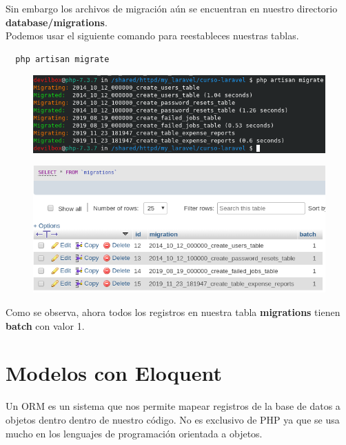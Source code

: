 \documentclass{article}
\begin{document}
Sin embargo los archivos de migración aún se encuentran en nuestro directorio
\textbf{database/migrations}.\\
Podemos usar el siguiente comando para reestableces nuestras tablas.\\

\begin{verbatim}
  php artisan migrate
\end{verbatim}

\begin{figure}[h!]
  \centering
  \includegraphics[scale=0.75]{./Pictures/036_migrate_again.png}
\end{figure}

\newpage

\begin{figure}[h!]
  \centering
  \includegraphics[scale=0.75]{./Pictures/037_migrations_table.png}
\end{figure}

Como se observa, ahora todos los registros en nuestra tabla \textbf{migrations}
tienen \textbf{batch} con valor 1.

\newpage

\section{Modelos con Eloquent}%
Un ORM es un sistema que nos permite mapear registros de la base de datos a
objetos dentro dentro de nuestro código. No es exclusivo de PHP ya que se usa
mucho en los lenguajes de programación orientada a objetos.\\
\end{document}
